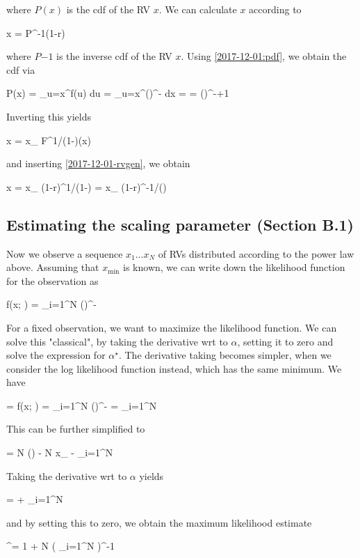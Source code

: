 where $P(x)$ is the cdf of the RV $x$. We can calculate $x$ according to

\be\label{2017-12-01-rvgen}
x = P^{-1}(1-r)
\ee

where $P{-1}$ is the inverse cdf of the RV $x$. Using \eqref{2017-12-01:pdf}, we obtain the cdf via

\bee
P(x) = \int_{u=x}^\infty f(u) du =  \int_{u=x}^\infty \left(\right)^{-\alpha} dx = \cdots = \left(\right)^{-\alpha+1}
\eee

Inverting this yields

\bee
x = x_{} F^{1/(1-\alpha)}(x)
\eee

and inserting \eqref{2017-12-01-rvgen}, we obtain

\bee
x = x_{} (1-r)^{1/(1-\alpha)} = x_{} (1-r)^{-1/()}
\eee

\subsection{Estimating the scaling parameter (Section B.1)}

Now we observe a sequence $x_1 \ldots x_N$ of RVs distributed according to the power law above. Assuming that $x_{\text{min}}$ is known, we can write down the likelihood function for the observation as

\bee
f(x; \alpha) = \prod_{i=1}^N  \left(\right)^{-\alpha}
\eee

For a fixed observation, we want to maximize the likelihood function. We can solve this "classical", by taking the derivative wrt to $\alpha$, setting it to zero and solve the expression for $\alpha^\star$. The derivative taking becomes simpler, when we consider the log likelihood function instead, which has the same minimum. We have

\bee
{} = \ln f(x; \alpha) = 
\ln \prod_{i=1}^N  \left(\right)^{-\alpha} = 
\sum_{i=1}^N 
\eee

This can be further simplified to

\bee
{} = N \ln () - N \ln x_{} - \alpha \sum_{i=1}^N \ln {}
\eee

Taking the derivative wrt to $\alpha$ yields

\bee
{} =  + \sum_{i=1}^N \ln {}
\eee

and by setting this to zero, we obtain the maximum likelihood estimate

\bee
\alpha^\star = 1 + N \left( \sum_{i=1}^N \ln {} \right)^{-1}
\eee